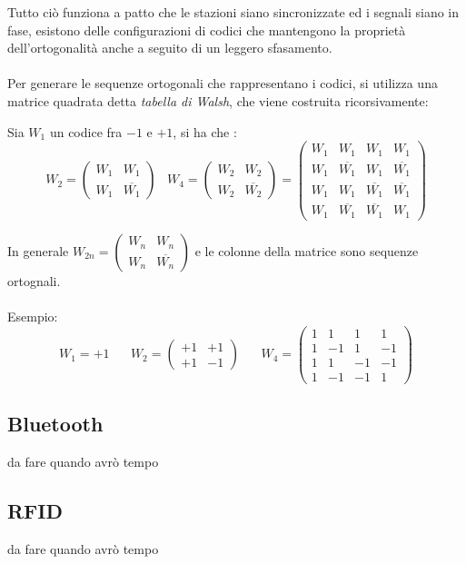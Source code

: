 \documentclass[12pt, letterpaper]{article}
\newcommand{\acc}{\\\hphantom{}\\}
\begin{document}
Tutto ciò funziona a patto che le stazioni siano sincronizzate ed i segnali siano in fase, esistono delle 
configurazioni di codici che mantengono la proprietà dell'ortogonalità anche a seguito di un leggero sfasamento.\acc 
Per generare le sequenze ortogonali che rappresentano i codici, si utilizza una matrice quadrata detta 
\textit{tabella di Walsh}, che viene costruita ricorsivamente:\begin{center}
    Sia $W_1$ un codice fra $-1$ e $+1$, si ha che : 
    $$ W_2=\begin{pmatrix}
        W_1&W_1\\ W_1&\overline{W_1}
    \end{pmatrix}\;\;\; W_4=\begin{pmatrix}
        W_2&W_2\\ W_2&\overline{W_2}\end{pmatrix}=\begin{pmatrix}
            W_1& W_1& W_1& W_1\\ 
            W_1&\overline{ W_1}& W_1&\overline{ W_1}\\ 
            W_1& W_1&\overline{W_1}&\overline{W_1}\\
            W_1&\overline{ W_1} &\overline{ W_1}&W_1
        \end{pmatrix}
    $$
\end{center}
    In generale $W_{2n} = \begin{pmatrix}
        W_n&W_n\\ W_n&\overline{W_n}
    \end{pmatrix}$ e le colonne della matrice sono sequenze ortognali.\acc  Esempio:
    $$ W_1 = +1 \;\;\;\;\;\;W_2=\begin{pmatrix}
        +1&+1\\ +1&-1
    \end{pmatrix}\;\;\;\;\;\;W_4=
    \begin{pmatrix}
        1& 1& 1& 1\\ 
        1&-1& 1&-1\\ 
        1& 1&-1&-1\\
        1&-1 &-1&1
    \end{pmatrix}$$
\subsection{Bluetooth}
\color{red}da fare quando avrò tempo\color{black}
\subsection{RFID}
\color{red}da fare quando avrò tempo\color{black}
\newpage 
\end{document}
